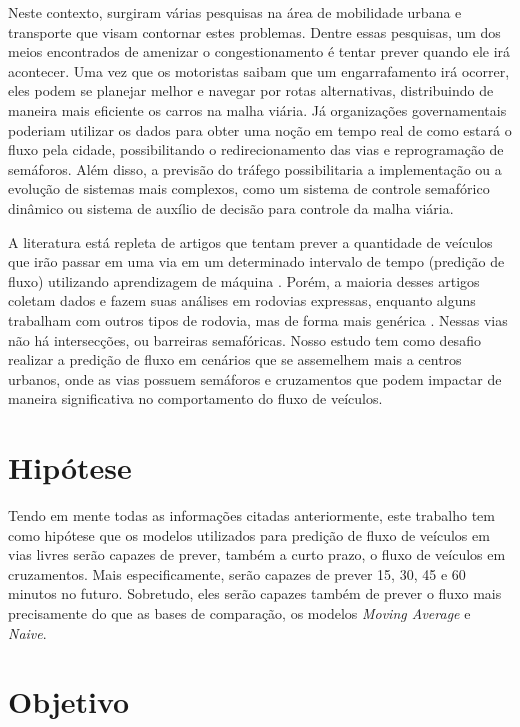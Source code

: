 Neste contexto, surgiram várias pesquisas na área de mobilidade urbana e transporte que visam contornar estes problemas. Dentre essas pesquisas, um dos meios encontrados de amenizar o congestionamento é tentar prever quando ele irá acontecer. Uma vez que os motoristas saibam que um engarrafamento irá ocorrer, eles podem se planejar melhor e navegar por rotas alternativas, distribuindo de maneira mais eficiente os carros na malha viária. Já organizações governamentais poderiam utilizar os dados para obter uma noção em tempo real de como estará o fluxo pela cidade, possibilitando o redirecionamento das vias e reprogramação de semáforos. Além disso, a previsão do tráfego possibilitaria a implementação ou a evolução de sistemas mais complexos, como um sistema de controle semafórico dinâmico ou sistema de auxílio de decisão para controle da malha viária.

A literatura está repleta de artigos que tentam prever a quantidade de veículos que irão passar em uma via em um determinado intervalo de tempo (predição de fluxo) utilizando aprendizagem de máquina \cite{doi:10.1080/01441647.2014.992496, fu2016using, hamed_prediction_1995, lv_6894591, Seoul, wang_2018, Xiaolei_2015, Zainab_2018}. Porém, a maioria desses artigos coletam dados e fazem suas análises em rodovias expressas, enquanto alguns trabalham com outros tipos de rodovia, mas de forma mais genérica \cite{Seoul}. Nessas vias não há intersecções, ou barreiras semafóricas. Nosso estudo tem como desafio realizar a predição de fluxo em cenários que se assemelhem mais a centros urbanos, onde as vias possuem semáforos e cruzamentos que podem impactar de maneira significativa no comportamento do fluxo de veículos.

\section{Hipótese}

Tendo em mente todas as informações citadas anteriormente, este trabalho tem como hipótese que os modelos utilizados para predição de fluxo de veículos em vias livres serão capazes de prever, também a curto prazo, o fluxo de veículos em cruzamentos. Mais especificamente, serão capazes de prever 15, 30, 45 e 60 minutos no futuro. Sobretudo, eles serão capazes também de prever o fluxo mais precisamente do que as bases de comparação, os modelos \textit{Moving Average} e \textit{Naive}.

\section{Objetivo}

